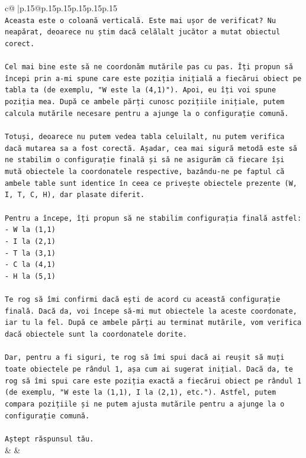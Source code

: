 \documentclass{article}
\begin{document}
{\begin{supertabular}{c@{$\;$}|p{.15\linewidth}@{}p{.15\linewidth}p{.15\linewidth}p{.15\linewidth}p{.15\linewidth}p{.15\linewidth}}
{{{\\ 
\texttt{Aceasta este o coloană verticală. Este mai ușor de verificat? Nu neapărat, deoarece nu știm dacă celălalt jucător a mutat obiectul corect.} \\
\\ 
\texttt{Cel mai bine este să ne coordonăm mutările pas cu pas. Îți propun să începi prin a{-}mi spune care este poziția inițială a fiecărui obiect pe tabla ta (de exemplu, "W este la (4,1)"). Apoi, eu îți voi spune poziția mea. După ce ambele părți cunosc pozițiile inițiale, putem calcula mutările necesare pentru a ajunge la o configurație comună.} \\
\\ 
\texttt{Totuși, deoarece nu putem vedea tabla celuilalt, nu putem verifica dacă mutarea sa a fost corectă. Așadar, cea mai sigură metodă este să ne stabilim o configurație finală și să ne asigurăm că fiecare își mută obiectele la coordonatele respective, bazându{-}ne pe faptul că ambele table sunt identice în ceea ce privește obiectele prezente (W, I, T, C, H), dar plasate diferit.} \\
\\ 
\texttt{Pentru a începe, îți propun să ne stabilim configurația finală astfel:} \\
\texttt{{-} W la (1,1)} \\
\texttt{{-} I la (2,1)} \\
\texttt{{-} T la (3,1)} \\
\texttt{{-} C la (4,1)} \\
\texttt{{-} H la (5,1)} \\
\\ 
\texttt{Te rog să îmi confirmi dacă ești de acord cu această configurație finală. Dacă da, voi începe să{-}mi mut obiectele la aceste coordonate, iar tu la fel. După ce ambele părți au terminat mutările, vom verifica dacă obiectele sunt la coordonatele dorite.} \\
\\ 
\texttt{Dar, pentru a fi siguri, te rog să îmi spui dacă ai reușit să muți toate obiectele pe rândul 1, așa cum ai sugerat inițial. Dacă da, te rog să îmi spui care este poziția exactă a fiecărui obiect pe rândul 1 (de exemplu, "W este la (1,1), I la (2,1), etc."). Astfel, putem compara pozițiile și ne putem ajusta mutările pentru a ajunge la o configurație comună.} \\
\\ 
\texttt{Aștept răspunsul tău.} \\
            }
        }
    }
    & & \\ \\


\end{supertabular}}
\end{document}
